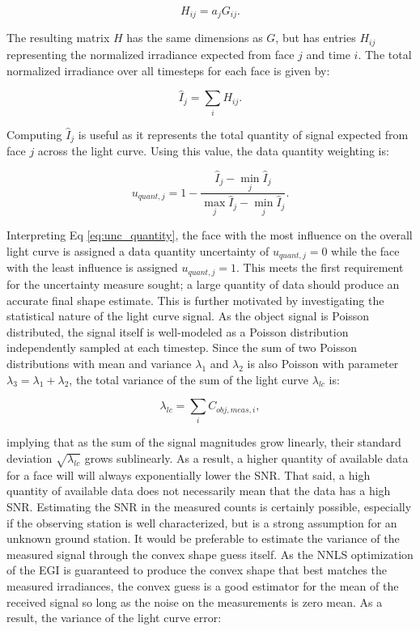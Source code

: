 \begin{equation} \label{eq:h_matrix}
  H_{ij} = a_j G_{ij}.
\end{equation}

The resulting matrix $H$ has the same dimensions as $G$, but has entries $H_{ij}$ representing the normalized irradiance expected from face $j$ and time $i$. The total normalized irradiance over all timesteps for each face is given by:

\begin{equation} \label{eq:total_norm_irrad}
  \hat{I}_{j} = \sum_{i}{H_{ij}}.
\end{equation}

Computing $\hat{I}_{j}$ is useful as it represents the total quantity of signal expected from face $j$ across the light curve. Using this value, the data quantity weighting is:

\begin{equation} \label{eq:unc_quantity}
  u_{quant,j} = 1 - \frac{\hat{I}_{j} - \min_{j}{\hat{I}_{j}}}{\max_{j}{\hat{I}_{j}} - \min_{j}{\hat{I}_{j}}}.
\end{equation}

Interpreting Eq \ref{eq:unc_quantity}, the face with the most influence on the overall light curve is assigned a data quantity uncertainty of $u_{quant,j} = 0$ while the face with the least influence is assigned $u_{quant,j} = 1$. This meets the first requirement for the uncertainty measure sought; a large quantity of data should produce an accurate final shape estimate. This is further motivated by investigating the statistical nature of the light curve signal. As the object signal is Poisson distributed, the signal itself is well-modeled as a Poisson distribution independently sampled at each timestep. Since the sum of two Poisson distributions with mean and variance $\lambda_1$ and $\lambda_2$ is also Poisson with parameter $\lambda_3 = \lambda_1 + \lambda_2$, the total variance of the sum of the light curve $\lambda_{lc}$ is:

\begin{equation}
  \lambda_{lc} = \sum_{i} C_{obj,meas,i},
\end{equation}

implying that as the sum of the signal magnitudes grow linearly, their standard deviation $\sqrt{\lambda_{lc}}$ grows sublinearly. As a result, a higher quantity of available data for a face will will always exponentially lower the SNR. That said, a high quantity of available data does not necessarily mean that the data has a high SNR. Estimating the SNR in the measured counts is certainly possible, especially if the observing station is well characterized, but is a strong assumption for an unknown ground station. It would be preferable to estimate the variance of the measured signal through the convex shape guess itself. As the NNLS optimization of the EGI is guaranteed to produce the convex shape that best matches the measured irradiances, the convex guess is a good estimator for the mean of the received signal so long as the noise on the measurements is zero mean. As a result, the variance of the light curve error:

